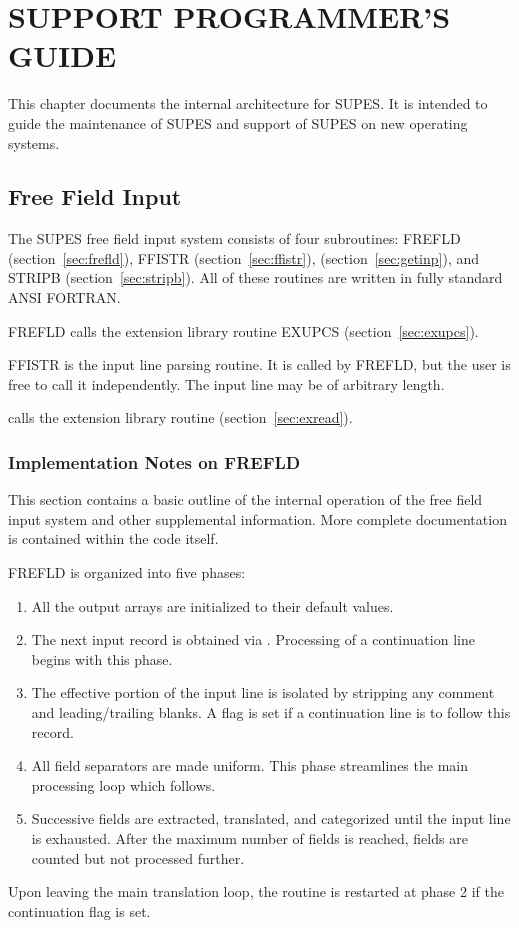 \chapter{SUPPORT PROGRAMMER'S GUIDE} \label{sec:support}
This chapter documents the internal architecture for SUPES.  It is intended
to guide the maintenance of SUPES and support of SUPES on new operating
systems.

\section{Free Field Input} The SUPES free field input system consists of
four subroutines: FREFLD (section~\ref{sec:frefld}),
FFISTR (section~\ref{sec:ffistr}), 
(section~\ref{sec:getinp}), and STRIPB (section~\ref{sec:stripb}). All of
these routines are written in fully standard ANSI FORTRAN.

FREFLD calls the extension library routine EXUPCS
(section~\ref{sec:exupcs}).

FFISTR is the input line parsing routine.  It is called by FREFLD, but
the user is free to call it independently.  The input line may be of
arbitrary length.

 calls the extension library routine 
(section~\ref{sec:exread}).


\subsection{Implementation Notes on FREFLD}

This section contains a basic outline of the internal operation of the free
field input system and other supplemental information.  More complete
documentation is contained within the code itself.

FREFLD is organized into five phases:
\begin{enumerate}
\item All the output arrays are initialized to their default values.

\item The next input record is obtained via .  Processing of a
        continuation line begins with this phase.

\item The effective portion of the input line is isolated by stripping any
        comment and leading/trailing blanks.  A flag is set if a
        continuation line is to follow this record.

\item All field separators are made uniform.  This phase streamlines the
        main processing loop which follows.

\item Successive fields are extracted, translated, and categorized until
        the input line is exhausted.  After the maximum number of fields is
        reached, fields are counted but not processed further.
\end{enumerate}
Upon leaving the main translation loop, the routine is restarted at phase 2
if the continuation flag is set.

